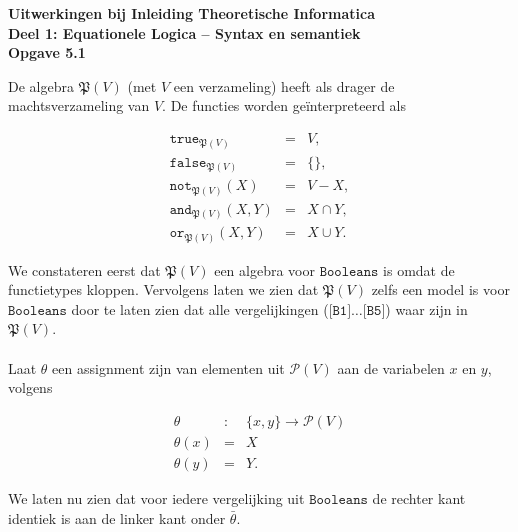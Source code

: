 \documentclass[a4paper,11pt]{article}
\begin{document}
{\bf Uitwerkingen bij Inleiding Theoretische Informatica\\
Deel 1: Equationele Logica -- Syntax en semantiek}\\[2em]


{\bf Opgave 5.1}

De algebra $\mathfrak{P}(V)$ (met $V$ een verzameling) heeft als drager de
machtsverzameling van $V$. De functies worden ge\"interpreteerd als

\begin{eqnarray*}
\texttt{true}_{\mathfrak{P}(V)}     & = & V , \\
\texttt{false}_{\mathfrak{P}(V)}    & = & \{\} , \\
\texttt{not}_{\mathfrak{P}(V)}(X)   & = & V - X , \\
\texttt{and}_{\mathfrak{P}(V)}(X,Y) & = & X \cap Y , \\
\texttt{or}_{\mathfrak{P}(V)}(X,Y)  & = & X \cup Y .
\end{eqnarray*}

We constateren eerst dat $\mathfrak{P}(V)$ een algebra voor
$\texttt{Booleans}$ is omdat de functietypes kloppen. Vervolgens laten we zien
dat $\mathfrak{P}(V)$ zelfs een model is voor $\texttt{Booleans}$ door te
laten zien dat alle vergelijkingen ($\texttt{[B1]} \ldots \texttt{[B5]}$) waar
zijn in $\mathfrak{P}(V)$.

\paragraph{}

Laat $\theta$ een assignment zijn van elementen uit $\mathcal{P}(V)$ aan
de variabelen $x$ en $y$, volgens

\begin{eqnarray*}
\theta & : & \{x,y\} \rightarrow \mathcal{P}(V) \\
\theta(x) & = & X \\
\theta(y) & = & Y.
\end{eqnarray*}

We laten nu zien dat voor iedere vergelijking uit $\texttt{Booleans}$ de
rechter kant identiek is aan de linker kant onder $\bar \theta$.
\end{document}
